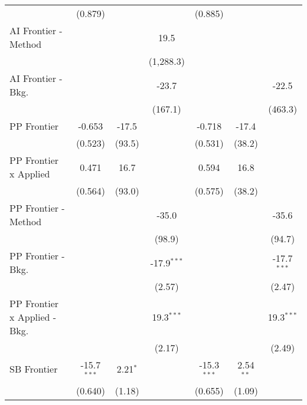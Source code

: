 \begin{tabular}{lcccccc}
                                & (0.879)       &            &               & (0.885)       &             &   \\   
   AI Frontier - Method         &               &            & 19.5          &               &             &   \\   
                                &               &            & (1,288.3)     &               &             &   \\   
   AI Frontier - Bkg.           &               &            & -23.7         &               &             & -22.5\\   
                                &               &            & (167.1)       &               &             & (463.3)\\   
   PP Frontier                  & -0.653        & -17.5      &               & -0.718        & -17.4       &   \\   
                                & (0.523)       & (93.5)     &               & (0.531)       & (38.2)      &   \\   
   PP Frontier x Applied        & 0.471         & 16.7       &               & 0.594         & 16.8        &   \\   
                                & (0.564)       & (93.0)     &               & (0.575)       & (38.2)      &   \\   
   PP Frontier - Method         &               &            & -35.0         &               &             & -35.6\\   
                                &               &            & (98.9)        &               &             & (94.7)\\   
   PP Frontier - Bkg.           &               &            & -17.9$^{***}$ &               &             & -17.7$^{***}$\\   
                                &               &            & (2.57)        &               &             & (2.47)\\   
   PP Frontier x Applied - Bkg. &               &            & 19.3$^{***}$  &               &             & 19.3$^{***}$\\   
                                &               &            & (2.17)        &               &             & (2.49)\\   
   SB Frontier                  & -15.7$^{***}$ & 2.21$^{*}$ &               & -15.3$^{***}$ & 2.54$^{**}$ &   \\   
                                & (0.640)       & (1.18)     &               & (0.655)       & (1.09)      &   \\   

\end{tabular}
